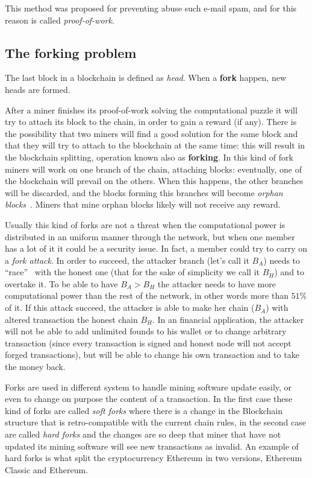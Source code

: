 This method was proposed for preventing abuse such e-mail spam, and for this
reason is called \textit{proof-of-work}\cite{back02}.

\subsection{The forking problem}

The last block in a blockchain is defined as \textit{head}. When a
\textbf{fork} happen, new heads are formed.

After a miner finishes its proof-of-work solving the computational puzzle
it will try to attach its block to the chain, in order to gain a reward (if
any). There is the possibility that two miners will find a good solution for
the same block and that they will try to attach to the blockchain at the same
time: this will result in the blockchain splitting, operation known also as
\textbf{forking}. In this kind of fork miners will work on one branch of the
chain, attaching blocks: eventually, one of the blockchain will prevail on the
others. When this happens, the other branches will be discarded, and the blocks
forming this branches will become \textit{orphan blocks}~\cite{decker13}.
Miners that mine orphan blocks likely will not receive any reward.

Usually this kind of forks are not a threat when the computational power is
distributed in an uniform manner through the network, but when one member has a
lot of it it could be a security issue. In fact, a member could try to carry on
a \textit{fork attack}. In order to succeed, the attacker branch (let's call it
$B_A$) needs to ``race''~\cite{nakamoto08} with the honest one (that for the
sake of simplicity we call it $B_H$) and to overtake it. To be able to have
$B_A > B_H$ the attacker needs to have more computational power than the rest of
the network, in other words more than $51\%$ of it.
If this attack succeed, the attacker is able to make her chain ($B_A$) with
altered transaction the honest chain $B_H$.
In an financial application, the attacker will not be able to add unlimited
founds to his wallet or to change arbitrary transaction (since every
transaction is signed and honest node will not accept forged transactions), but
will be able to change his own transaction and to take the money back.

Forks are used in different system to handle mining software update easily, or
even to change on purpose the content of a transaction. In the first case these
kind of forks are called \textit{soft forks} where there is a change in the
Blockchain structure that is retro-compatible with the current chain rules, in
the second case are called \textit{hard forks} and the changes are so deep that
miner that have not updated its mining software will see new transactions
as invalid. An example of hard forks is what split the cryptocurrency Ethereum
in two versions, Ethereum Classic and Ethereum.
